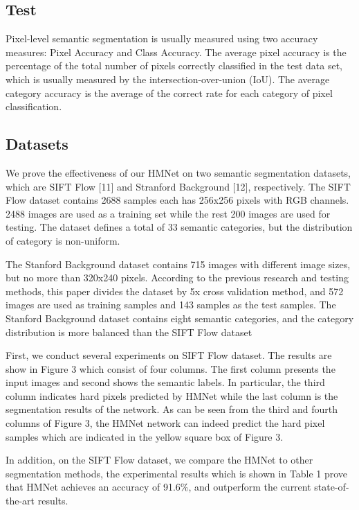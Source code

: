 \documentclass[10.5pt,compsoc]{TsT}
\theoremstyle{mystyle}
\begin{document}
{\subsection{Test}
\noindent
Pixel-level semantic segmentation is usually measured using two accuracy measures: Pixel Accuracy and Class Accuracy. The average pixel accuracy is the percentage of the total number of pixels correctly classified in the test data set, which is usually measured by the intersection-over-union (IoU). The average category accuracy is the average of the correct rate for each category of pixel classification.

\subsection{Datasets}
\noindent
We prove the effectiveness of our HMNet on two semantic segmentation datasets, which are SIFT Flow [11] and Stranford Background [12], respectively. The SIFT Flow dataset contains 2688 samples each has 256x256 pixels with RGB channels. 2488 images are used as a training set while the rest 200 images are used for testing. The dataset defines a total of 33 semantic categories, but the distribution of category is non-uniform.

The Stanford Background dataset contains 715 images with different image sizes, but no more than 320x240 pixels. According to the previous research and testing methods, this paper divides the dataset by 5x cross validation method, and 572 images are used as training samples and 143 samples as the test samples. The Stanford Background dataset contains eight semantic categories, and the category distribution is more balanced than the SIFT Flow dataset

First, we conduct several experiments on SIFT Flow dataset. The results are show in Figure 3 which consist of four columns. The first column presents the input images and second shows the semantic labels. In particular, the third column indicates hard pixels predicted by HMNet while the last column is the segmentation results of the network. As can be seen from the third and fourth columns of Figure 3, the HMNet network can indeed predict the hard pixel samples which are indicated in the yellow square box of Figure 3.

In addition, on the SIFT Flow dataset, we compare the HMNet to other segmentation methods, the experimental results which is shown in Table 1 prove that HMNet achieves an accuracy of 91.6\%, and outperform the current state-of-the-art results.

}
\end{document}
